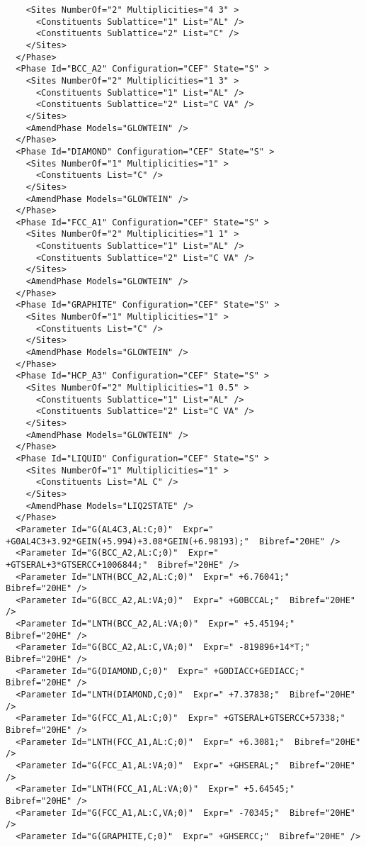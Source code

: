 \documentclass{article}
\begin{document}
\begin{appendices}
{\begin{verbatim}
    <Sites NumberOf="2" Multiplicities="4 3" >
      <Constituents Sublattice="1" List="AL" />
      <Constituents Sublattice="2" List="C" />
    </Sites>
  </Phase>
  <Phase Id="BCC_A2" Configuration="CEF" State="S" >
    <Sites NumberOf="2" Multiplicities="1 3" >
      <Constituents Sublattice="1" List="AL" />
      <Constituents Sublattice="2" List="C VA" />
    </Sites>
    <AmendPhase Models="GLOWTEIN" />
  </Phase>
  <Phase Id="DIAMOND" Configuration="CEF" State="S" >
    <Sites NumberOf="1" Multiplicities="1" >
      <Constituents List="C" />
    </Sites>
    <AmendPhase Models="GLOWTEIN" />
  </Phase>
  <Phase Id="FCC_A1" Configuration="CEF" State="S" >
    <Sites NumberOf="2" Multiplicities="1 1" >
      <Constituents Sublattice="1" List="AL" />
      <Constituents Sublattice="2" List="C VA" />
    </Sites>
    <AmendPhase Models="GLOWTEIN" />
  </Phase>
  <Phase Id="GRAPHITE" Configuration="CEF" State="S" >
    <Sites NumberOf="1" Multiplicities="1" >
      <Constituents List="C" />
    </Sites>
    <AmendPhase Models="GLOWTEIN" />
  </Phase>
  <Phase Id="HCP_A3" Configuration="CEF" State="S" >
    <Sites NumberOf="2" Multiplicities="1 0.5" >
      <Constituents Sublattice="1" List="AL" />
      <Constituents Sublattice="2" List="C VA" />
    </Sites>
    <AmendPhase Models="GLOWTEIN" />
  </Phase>
  <Phase Id="LIQUID" Configuration="CEF" State="S" >
    <Sites NumberOf="1" Multiplicities="1" >
      <Constituents List="AL C" />
    </Sites>
    <AmendPhase Models="LIQ2STATE" />
  </Phase>
  <Parameter Id="G(AL4C3,AL:C;0)"  Expr=" +G0AL4C3+3.92*GEIN(+5.994)+3.08*GEIN(+6.98193);"  Bibref="20HE" />
  <Parameter Id="G(BCC_A2,AL:C;0)"  Expr=" +GTSERAL+3*GTSERCC+1006844;"  Bibref="20HE" />
  <Parameter Id="LNTH(BCC_A2,AL:C;0)"  Expr=" +6.76041;"  Bibref="20HE" />
  <Parameter Id="G(BCC_A2,AL:VA;0)"  Expr=" +G0BCCAL;"  Bibref="20HE" />
  <Parameter Id="LNTH(BCC_A2,AL:VA;0)"  Expr=" +5.45194;"  Bibref="20HE" />
  <Parameter Id="G(BCC_A2,AL:C,VA;0)"  Expr=" -819896+14*T;"  Bibref="20HE" />
  <Parameter Id="G(DIAMOND,C;0)"  Expr=" +G0DIACC+GEDIACC;"  Bibref="20HE" />
  <Parameter Id="LNTH(DIAMOND,C;0)"  Expr=" +7.37838;"  Bibref="20HE" />
  <Parameter Id="G(FCC_A1,AL:C;0)"  Expr=" +GTSERAL+GTSERCC+57338;"  Bibref="20HE" />
  <Parameter Id="LNTH(FCC_A1,AL:C;0)"  Expr=" +6.3081;"  Bibref="20HE" />
  <Parameter Id="G(FCC_A1,AL:VA;0)"  Expr=" +GHSERAL;"  Bibref="20HE" />
  <Parameter Id="LNTH(FCC_A1,AL:VA;0)"  Expr=" +5.64545;"  Bibref="20HE" />
  <Parameter Id="G(FCC_A1,AL:C,VA;0)"  Expr=" -70345;"  Bibref="20HE" />
  <Parameter Id="G(GRAPHITE,C;0)"  Expr=" +GHSERCC;"  Bibref="20HE" />

\end{verbatim}}
\end{appendices}
\end{document}
